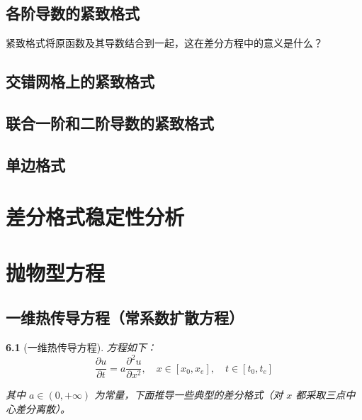 \documentclass[zihao=5,UTF8]{report}
\theoremstyle{MyTheoremStyle} %
\theoremstyle{MySubsubsectionStyle} %
\newtheorem{definition}{}
\begin{document}
\section{各阶导数的紧致格式}

{\par\color{gray}\small
紧致格式将原函数及其导数结合到一起，这在差分方程中的意义是什么？
\par}

\section{交错网格上的紧致格式}
\section{联合一阶和二阶导数的紧致格式}
\section{单边格式}
\chapter{差分格式稳定性分析}

\chapter{抛物型方程}

\section{一维热传导方程（常系数扩散方程）}


\begin{definition}[一维热传导方程]

方程如下：
\begin{equation}
    \frac{\partial u}{\partial t}=a\frac{\partial^2u}{\partial x^2},\quad x\in [x_0, x_e],\quad t \in [t_0, t_e]
\end{equation}

其中 $a \in (0, +\infty)$ 为常量，下面推导一些典型的差分格式（对 $x$ 都采取三点中心差分离散）。    

\end{definition}
\end{document}
